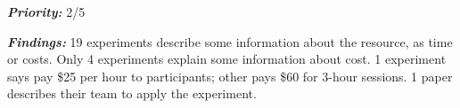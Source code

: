 \noindent \textit{\textbf{Priority:}} 2/5
\vspace{5mm}

\noindent \textit{\textbf{Findings:}} 19 experiments describe some information about the resource, as time or costs. Only 4 experiments explain some information about cost. 1 experiment says pay \$25 per hour to participants; other pays \$60 for 3-hour sessions. 1 paper describes their team to apply the experiment.
\vspace{5mm}